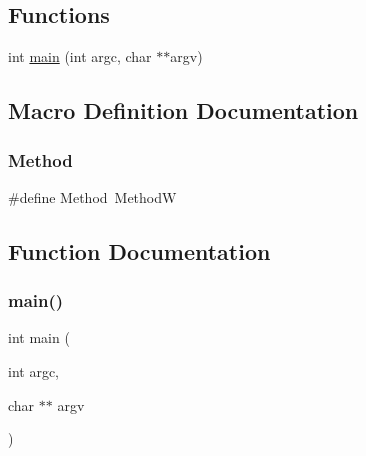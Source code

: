 \subsection*{Functions}
\begin{DoxyCompactItemize}
\item 
int \mbox{\hyperlink{gmock-spec-builders__test_8cc_a3c04138a5bfe5d72780bb7e82a18e627}{main}} (int argc, char $\ast$$\ast$argv)
\end{DoxyCompactItemize}


\subsection{Macro Definition Documentation}
\mbox{\label{gmock-spec-builders__test_8cc_a95606368148f3e5aab5db46c32466afd}} 
\subsubsection{\texorpdfstring{Method}{Method}}
{\footnotesize\ttfamily \#define Method~MethodW}



\subsection{Function Documentation}
\mbox{\label{gmock-spec-builders__test_8cc_a3c04138a5bfe5d72780bb7e82a18e627}} 
\subsubsection{\texorpdfstring{main()}{main()}}
{\footnotesize\ttfamily int main (\begin{DoxyParamCaption}\item[{int}]{argc,  }\item[{char $\ast$$\ast$}]{argv }\end{DoxyParamCaption})}

